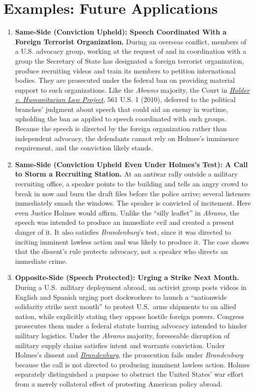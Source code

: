 \documentclass[12pt]{article}
\begin{document}
\section{Examples: Future Applications}
\begin{enumerate}

\item \textbf{Same-Side (Conviction Upheld): Speech Coordinated With a Foreign Terrorist Organization.} During an overseas conflict, members of a U.S. advocacy group, working at the request of and in coordination with a group the Secretary of State has designated a foreign terrorist organization, produce recruiting videos and train its members to petition international bodies. They are prosecuted under the federal ban on providing material support to such organizations. Like the \textit{Abrams} majority, the Court in \href{https://supreme.justia.com/cases/federal/us/561/1/}{\textit{Holder v. Humanitarian Law Project}}, 561 U.S. 1 (2010), deferred to the political branches' judgment about speech that could aid an enemy in wartime, upholding the ban as applied to speech coordinated with such groups. Because the speech is directed by the foreign organization rather than independent advocacy, the defendants cannot rely on Holmes's imminence requirement, and the conviction likely stands.

\item \textbf{Same-Side (Conviction Upheld Even Under Holmes's Test): A Call to Storm a Recruiting Station.} At an antiwar rally outside a military recruiting office, a speaker points to the building and tells an angry crowd to break in now and burn the draft files before the police arrive; several listeners immediately smash the windows. The speaker is convicted of incitement. Here even Justice Holmes would affirm. Unlike the ``silly leaflet'' in \textit{Abrams}, the speech was intended to produce an immediate evil and created a present danger of it. It also satisfies \textit{Brandenburg}'s test, since it was directed to inciting imminent lawless action and was likely to produce it. The case shows that the dissent's rule protects advocacy, not a speaker who directs an immediate crime.

\item \textbf{Opposite-Side (Speech Protected): Urging a Strike Next Month.} During a U.S.\ military deployment abroad, an activist group posts videos in English and Spanish urging port dockworkers to launch a ``nationwide solidarity strike next month'' to protest U.S.\ arms shipments to an allied nation, while explicitly stating they oppose hostile foreign powers. Congress prosecutes them under a federal statute barring advocacy intended to hinder military logistics. Under the \emph{Abrams} majority, foreseeable disruption of military supply chains satisfies intent and warrants conviction. Under Holmes's dissent and \href{https://supreme.justia.com/cases/federal/us/395/444/}{\emph{Brandenburg}}, the prosecution fails under \emph{Brandenburg} because the call is not directed to producing imminent lawless action. Holmes separately distinguished a purpose to obstruct the United States' war effort from a merely collateral effect of protesting American policy abroad.


\end{enumerate}
\end{document}
